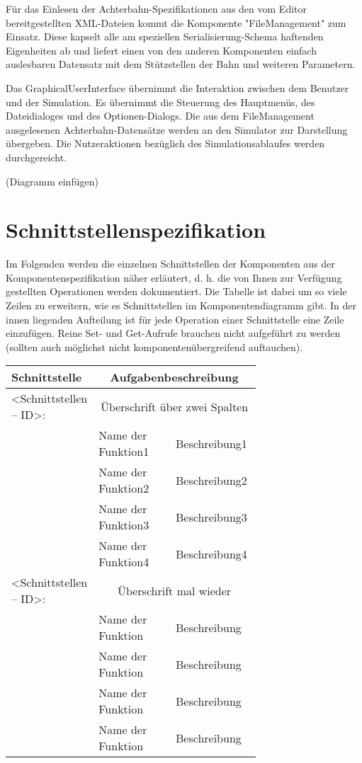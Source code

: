 Für das Einlesen der Achterbahn-Spezifikationen aus den vom Editor bereitgestellten
XML-Dateien kommt die Komponente "FileManagement" zum Einsatz. Diese kapselt alle
am speziellen Serialisierung-Schema haftenden Eigenheiten ab und liefert einen
von den anderen Komponenten einfach auslesbaren Datensatz mit dem Stützstellen der
Bahn und weiteren Parametern.

Das GraphicalUserInterface übernimmt die Interaktion zwischen dem Benutzer und
der Simulation. Es übernimmt die Steuerung des Hauptmenüs, des Dateidialoges und
des Optionen-Dialogs. Die aus dem FileManagement ausgelesenen Achterbahn-Datensätze
werden an den Simulator zur Darstellung übergeben. Die Nutzeraktionen bezüglich des
Simulationsablaufes werden durchgereicht.

(Diagramm einfügen)

\section{Schnittstellenspezifikation}

Im Folgenden werden die einzelnen Schnittstellen der Komponenten aus der
Komponentenspezifikation näher erläutert, d. h. die von Ihnen zur Verfügung
gestellten Operationen werden dokumentiert. Die Tabelle ist dabei um so viele
Zeilen zu erweitern, wie es Schnittstellen im Komponentendiagramm gibt. In der
innen liegenden Aufteilung ist für jede Operation einer Schnittstelle eine
Zeile einzufügen.  Reine Set- und Get-Aufrufe brauchen nicht aufgeführt zu
werden (sollten auch möglichst nicht komponentenübergreifend auftauchen).

\begin{tabular}[ht]{|l|p{0.35\linewidth}|p{0.35\linewidth}|}
 \hline
 Schnittstelle & \multicolumn{2}{|c|}{Aufgabenbeschreibung}\\
 \hline\hline
    <Schnittstellen – ID>: & \multicolumn{2}{|c|}{Überschrift über zwei Spalten}\\
 \hline
 & Name der Funktion1 & Beschreibung1\\ 
 & Name der Funktion2 & Beschreibung2\\ 
 & Name der Funktion3 & Beschreibung3\\ 
 & Name der Funktion4 & Beschreibung4\\ 
\hline
    <Schnittstellen – ID>: & \multicolumn{2}{|c|}{Überschrift mal wieder}\\
 \hline
 & Name der Funktion & Beschreibung\\ 
 & Name der Funktion & Beschreibung\\ 
 & Name der Funktion & Beschreibung\\ 
 & Name der Funktion & Beschreibung\\ 
 \hline
   \end{tabular}





